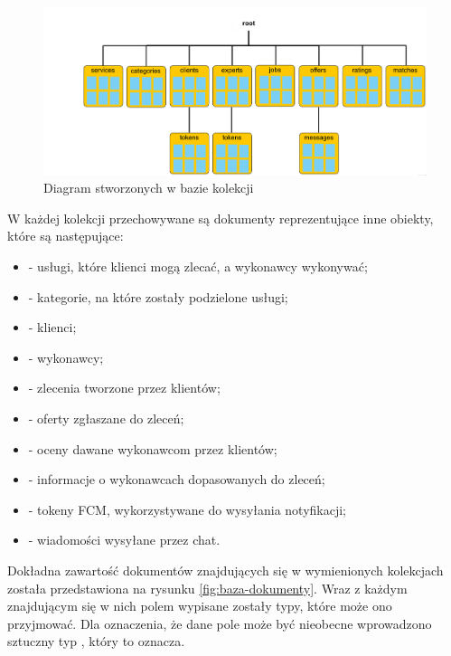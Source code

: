 \begin{figure}[ht]
  \centering
  \includegraphics[width=\linewidth]{images/db_collections.png}
  \caption{Diagram stworzonych w bazie kolekcji}
  \label{fig:baza-kolekcje}
\end{figure}

\vspace{\baselineskip}

\noindent W każdej kolekcji przechowywane są dokumenty reprezentujące inne obiekty, które są następujące:
\begin{itemize}
    \item \textbf{} - usługi, które klienci mogą zlecać, a wykonawcy wykonywać;
    \item \textbf{} - kategorie, na które zostały podzielone usługi;
    \item \textbf{} - klienci;
    \item \textbf{} - wykonawcy;
    \item \textbf{} - zlecenia tworzone przez klientów;
    \item \textbf{} - oferty zgłaszane do zleceń;
    \item \textbf{} - oceny dawane wykonawcom przez klientów;
    \item \textbf{} - informacje o wykonawcach dopasowanych do zleceń;
    \item \textbf{} - tokeny FCM, wykorzystywane do wysyłania notyfikacji;
    \item \textbf{} - wiadomości wysyłane przez chat.
\end{itemize}

\vspace{\baselineskip}

Dokładna zawartość dokumentów znajdujących się w wymienionych kolekcjach została przedstawiona na rysunku \ref{fig:baza-dokumenty}. Wraz z każdym znajdującym się w nich polem wypisane zostały typy, które może ono przyjmować. Dla oznaczenia, że dane pole może być nieobecne wprowadzono sztuczny typ , który to oznacza.

